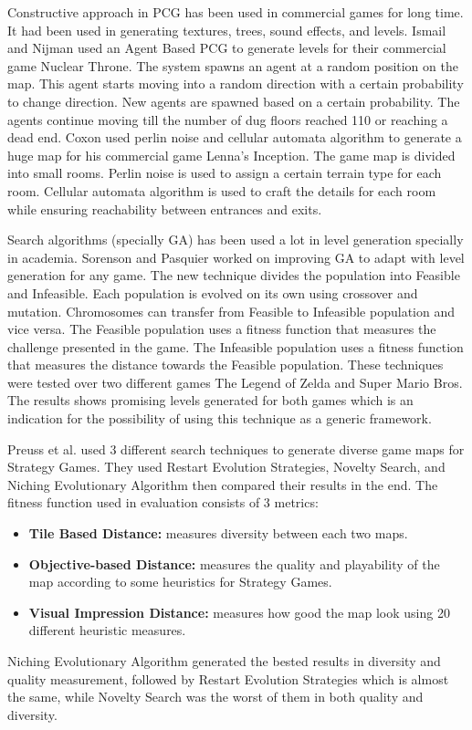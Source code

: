 Constructive approach in PCG has been used in commercial games for long time. It had been used in generating textures, trees, sound effects, and levels. Ismail and Nijman\cite{nuclearThrone} used an Agent Based PCG to generate levels for their commercial game Nuclear Throne. The system spawns an agent at a random position on the map. This agent starts moving into a random direction with a certain probability to change direction. New agents are spawned based on a certain probability. The agents continue moving till the number of dug floors reached 110 or reaching a dead end. Coxon\cite{lennaInception} used perlin noise and cellular automata algorithm to generate a huge map for his commercial game Lenna's Inception. The game map is divided into small rooms. Perlin noise is used to assign a certain terrain type for each room. Cellular automata algorithm is used to craft the details for each room while ensuring reachability between entrances and exits.\\\par

Search algorithms (specially GA) has been used a lot in level generation specially in academia. Sorenson and Pasquier\cite{genericLevelFramework} worked on improving GA to adapt with level generation for any game. The new technique divides the population into Feasible and Infeasible. Each population is evolved on its own using crossover and mutation. Chromosomes can transfer from Feasible to Infeasible population and vice versa. The Feasible population uses a fitness function that measures the challenge presented in the game. The Infeasible population uses a fitness function that measures the distance towards the Feasible population. These techniques were tested over two different games The Legend of Zelda and Super Mario Bros. The results shows promising levels generated for both games which is an indication for the possibility of using this technique as a generic framework.\\\par

Preuss et al.\cite{goodDiverseLevels} used 3 different search techniques to generate diverse game maps for Strategy Games. They used Restart Evolution Strategies, Novelty Search, and Niching Evolutionary Algorithm then compared their results in the end. The fitness function used in evaluation consists of 3 metrics:
\begin{itemize} \itemsep0pt \parskip0pt 
	\item \textbf{Tile Based Distance:} measures diversity between each two maps.
	\item \textbf{Objective-based Distance:} measures the quality and playability of the map according to some heuristics for Strategy Games.
	\item \textbf{Visual Impression Distance:} measures how good the map look using 20 different heuristic measures.
\end{itemize}
Niching Evolutionary Algorithm generated the bested results in diversity and quality measurement, followed by Restart Evolution Strategies which is almost the same, while Novelty Search was the worst of them in both quality and diversity.\\\par

